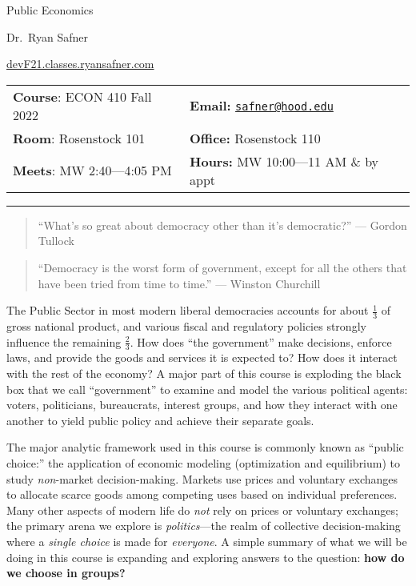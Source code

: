 \documentclass{article}
\begin{document}
\sffamily

\centerline{\Huge Public Economics}

\vspace{3 mm}

\centerline{\large Dr.~Ryan Safner}
\vspace{2 mm}
\centerline{\large \href{http://devF21.classes.ryansafner.com}{devF21.classes.ryansafner.com}}

\vspace{5 mm}

\begin{tabular}{@{}p{3.5in}p{3.5in}}           
\textbf{Course}: ECON 410 Fall
2022  & \textbf{Email:}  \href{mailto:safner@hood.edu}{\nolinkurl{safner@hood.edu}}\\
\textbf{Room}: Rosenstock 101 & \textbf{Office:}  Rosenstock 110\\
\textbf{Meets}: MW 2:40---4:05 PM & \textbf{Hours:}  MW 10:00---11 AM \&
by appt\\ 
\end{tabular}

\vspace{5 mm}

\hrule


\begin{quote}
``What's so great about democracy other than it's democratic?'' {---
Gordon Tullock}
\end{quote}

\begin{quote}
``Democracy is the worst form of government, except for all the others
that have been tried from time to time.'' {--- Winston Churchill}
\end{quote}

{The Public Sector} in most modern liberal democracies accounts for
about \(\frac{1}{3}\) of gross national product, and various fiscal and
regulatory policies strongly influence the remaining \(\frac{2}{3}\).
How does ``the government'' make decisions, enforce laws, and provide
the goods and services it is expected to? How does it interact with the
rest of the economy? A major part of this course is exploding the black
box that we call ``government'' to examine and model the various
political agents: voters, politicians, bureaucrats, interest groups, and
how they interact with one another to yield public policy and achieve
their separate goals.

The major analytic framework used in this course is commonly known as
``public choice:'' the application of economic modeling (optimization
and equilibrium) to study \emph{non}-market decision-making. Markets use
prices and voluntary exchanges to allocate scarce goods among competing
uses based on individual preferences. Many other aspects of modern life
do \emph{not} rely on prices or voluntary exchanges; the primary arena
we explore is \emph{politics}---the realm of collective decision-making
where a \emph{single choice} is made for \emph{everyone}. A simple
summary of what we will be doing in this course is expanding and
exploring answers to the question: \textbf{how do we choose in groups?}
\end{document}
